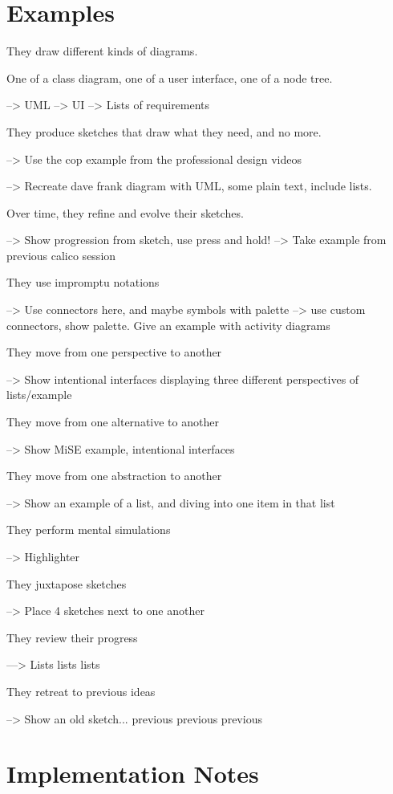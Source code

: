 \documentclass[12pt,fleqn]{ucithesis}
\begin{document}
\section{Examples}

They draw different kinds of diagrams.

One of a class diagram, one of a user interface, one of a node tree.

--> UML
--> UI
--> Lists of requirements

They produce sketches that draw what they need, and no more.

--> Use the cop example from the professional design videos

--> Recreate dave frank diagram with UML, some plain text, include lists.

Over time, they refine and evolve their sketches.

--> Show progression from sketch, use press and hold!
--> Take example from previous calico session

They use impromptu notations

--> Use connectors here, and maybe symbols with palette
--> use custom connectors, show palette. Give an example with activity diagrams

They move from one perspective to another

--> Show intentional interfaces displaying three different perspectives of lists/example

They move from one alternative to another

--> Show MiSE example, intentional interfaces

They move from one abstraction to another

--> Show an example of a list, and diving into one item in that list

They perform mental simulations

--> Highlighter

They juxtapose sketches

--> Place 4 sketches next to one another

They review their progress

---> Lists lists lists

They retreat to previous ideas

--> Show an old sketch... previous previous previous

\section{Implementation Notes}
\end{document}
